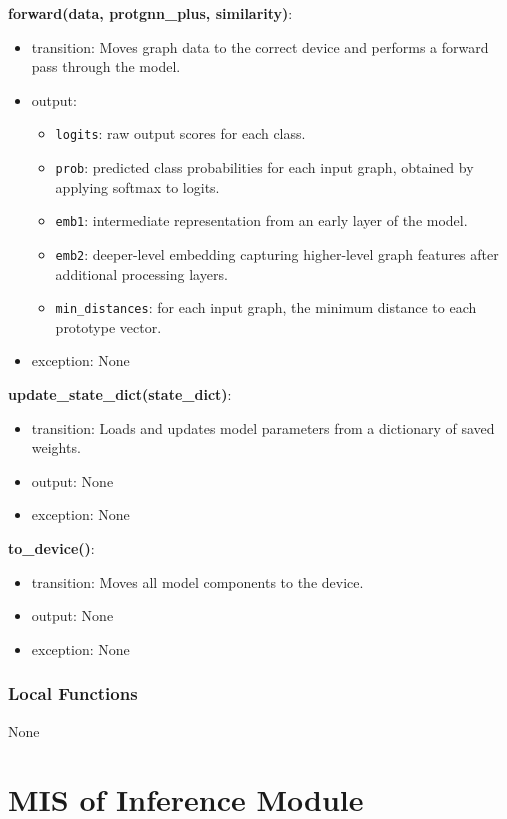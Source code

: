 \documentclass[12pt, titlepage]{article}
\begin{document}
\noindent \textbf{forward(data, protgnn\_plus, similarity)}:
\begin{itemize}
  \item transition: Moves graph data to the correct device and performs a forward pass through the model.
  \item output:
    \begin{itemize}
      \item \texttt{logits}: raw output scores for each class.
      \item \texttt{prob}: predicted class probabilities for each input graph, obtained by applying softmax to logits.
      \item \texttt{emb1}: intermediate representation from an early layer of the model.
      \item \texttt{emb2}: deeper-level embedding capturing higher-level graph features after additional processing layers.
      \item \texttt{min\_distances}: for each input graph, the minimum distance to each prototype vector.
    \end{itemize}
  \item exception: None
\end{itemize}

\noindent \textbf{update\_state\_dict(state\_dict)}:
\begin{itemize}
  \item transition: Loads and updates model parameters from a dictionary of saved weights.
  \item output: None
  \item exception: None
\end{itemize}

\noindent \textbf{to\_device()}:
\begin{itemize}
  \item transition: Moves all model components to the device.
  \item output: None
  \item exception: None
\end{itemize}

\subsubsection{Local Functions}
None





\section{MIS of Inference Module} \label{Test}
\end{document}

